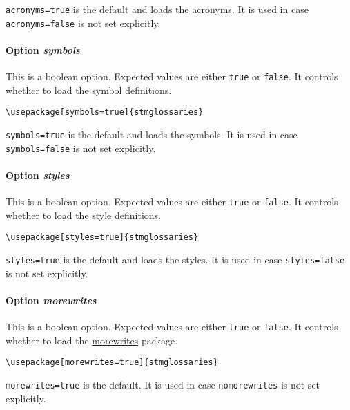 \documentclass{scrartcl}
\begin{document}
\texttt{acronyms=true} is the default and loads the acronyms. It is used in case \texttt{acronyms=false} is not set explicitly.

\paragraph{Option \protect\textit{symbols}}
\label{sec:usage:preamble:wholepackage:options:symbols}

This is a boolean option. Expected values are either \texttt{true} or \texttt{false}. It controls whether to load the symbol definitions.

\begin{verbatim}
\usepackage[symbols=true]{stmglossaries}
\end{verbatim}

\texttt{symbols=true} is the default and loads the symbols. It is used in case \texttt{symbols=false} is not set explicitly.

\paragraph{Option \protect\textit{styles}}
\label{sec:usage:preamble:wholepackage:options:styles}

This is a boolean option. Expected values are either \texttt{true} or \texttt{false}. It controls whether to load the style definitions.

\begin{verbatim}
\usepackage[styles=true]{stmglossaries}
\end{verbatim}

\texttt{styles=true} is the default and loads the styles. It is used in case \texttt{styles=false} is not set explicitly.

\paragraph{Option \protect\textit{morewrites}}
\label{sec:usage:preamble:wholepackage:options:morewrites}

This is a boolean option. Expected values are either \texttt{true} or \texttt{false}. It controls whether to load the \href{https://ctan.org/pkg/morewrites?lang=en}{morewrites} package.

\begin{verbatim}
\usepackage[morewrites=true]{stmglossaries}
\end{verbatim}

\texttt{morewrites=true} is the default. It is used in case \texttt{nomorewrites} is not set explicitly.
\end{document}
